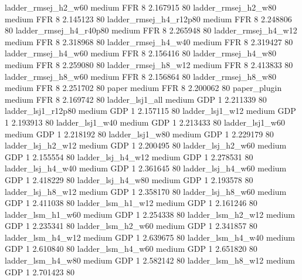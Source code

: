    ladder_rmsej_h2_w60     medium      FFR                 8 2.167915 80
   ladder_rmsej_h2_w80     medium      FFR                 8 2.145123 80
ladder_rmsej_h4_r12p80     medium      FFR                 8 2.248806 80
ladder_rmsej_h4_r40p80     medium      FFR                 8 2.265948 80
   ladder_rmsej_h4_w12     medium      FFR                 8 2.318968 80
   ladder_rmsej_h4_w40     medium      FFR                 8 2.319427 80
   ladder_rmsej_h4_w60     medium      FFR                 8 2.156416 80
   ladder_rmsej_h4_w80     medium      FFR                 8 2.259080 80
   ladder_rmsej_h8_w12     medium      FFR                 8 2.413833 80
   ladder_rmsej_h8_w60     medium      FFR                 8 2.156864 80
   ladder_rmsej_h8_w80     medium      FFR                 8 2.251702 80
                 paper     medium      FFR                 8 2.200062 80
          paper_plugin     medium      FFR                 8 2.169742 80
       ladder_lsj1_all     medium      GDP                 1 2.211339 80
    ladder_lsj1_r12p80     medium      GDP                 1 2.157115 80
       ladder_lsj1_w12     medium      GDP                 1 2.193913 80
       ladder_lsj1_w40     medium      GDP                 1 2.213433 80
       ladder_lsj1_w60     medium      GDP                 1 2.218192 80
       ladder_lsj1_w80     medium      GDP                 1 2.229179 80
     ladder_lsj_h2_w12     medium      GDP                 1 2.200495 80
     ladder_lsj_h2_w60     medium      GDP                 1 2.155554 80
     ladder_lsj_h4_w12     medium      GDP                 1 2.278531 80
     ladder_lsj_h4_w40     medium      GDP                 1 2.361645 80
     ladder_lsj_h4_w60     medium      GDP                 1 2.418229 80
     ladder_lsj_h4_w80     medium      GDP                 1 2.193578 80
     ladder_lsj_h8_w12     medium      GDP                 1 2.358170 80
     ladder_lsj_h8_w60     medium      GDP                 1 2.411038 80
     ladder_lsm_h1_w12     medium      GDP                 1 2.161246 80
     ladder_lsm_h1_w60     medium      GDP                 1 2.254338 80
     ladder_lsm_h2_w12     medium      GDP                 1 2.235341 80
     ladder_lsm_h2_w60     medium      GDP                 1 2.341857 80
     ladder_lsm_h4_w12     medium      GDP                 1 2.639675 80
     ladder_lsm_h4_w40     medium      GDP                 1 2.610840 80
     ladder_lsm_h4_w60     medium      GDP                 1 2.651820 80
     ladder_lsm_h4_w80     medium      GDP                 1 2.582142 80
     ladder_lsm_h8_w12     medium      GDP                 1 2.701423 80

